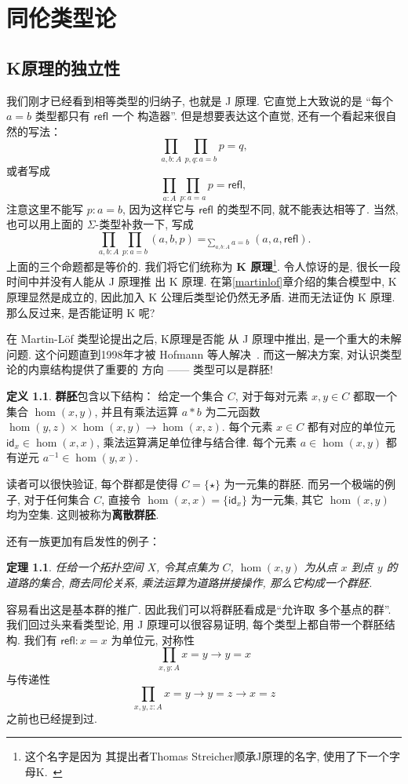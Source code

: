 \documentclass[UTF8]{ctexbook}
\newcommand{\cons}[1]{\textsf{#1}}
\theoremstyle{plain}
\newtheorem{theorem}{定理}[chapter]
\theoremstyle{definition}
\newtheorem{definition}{定义}[chapter]
\theoremstyle{remark}
\begin{document}
\chapter{同伦类型论}
\section{K原理的独立性}
我们刚才已经看到相等类型的归纳子, 也就是 J 原理. 它直觉上大致说的是
“每个 \(a = b\) 类型都只有 \(\cons{refl}\) 一个
构造器”. 但是想要表达这个直觉, 还有一个看起来很自然的写法：
\[\prod_{a,b : A} \prod_{p,q : a = b} p = q,\]
或者写成
\[\prod_{a : A} \prod_{p : a = a} p = \cons{refl},\]
注意这里不能写 \(p : a = b\), 因为这样它与
\(\cons{refl}\) 的类型不同, 就不能表达相等了.
当然, 也可以用上面的 \(\Sigma\)-类型补救一下, 写成
\[\prod_{a,b : A} \prod_{p: a = b} (a,b,p) =_{\sum_{a,b : A}a = b} (a,a,\cons{refl}).\]
上面的三个命题都是等价的. 我们将它们统称为
\textbf{K 原理}\footnote{这个名字是因为
其提出者Thomas Streicher顺承J原理的名字, 使用了下一个字母K.~\cite{streicher:1993:K}}.
令人惊讶的是, 很长一段时间中并没有人能从 J 原理推
出 K 原理. 在第\ref{martinlof}章介绍的集合模型中,
K 原理显然是成立的, 因此加入 K 公理后类型论仍然无矛盾.
进而无法证伪 K 原理. 那么反过来, 是否能证明 K 呢?

在 Martin-L\"of 类型论提出之后, K原理是否能
从 J 原理中推出, 是一个重大的未解问题.
这个问题直到1998年才被 Hofmann 等人解决~\cite{hofmann:1998:groupoid}.
而这一解决方案, 对认识类型论的内禀结构提供了重要的
方向 ------ 类型可以是群胚!

\begin{definition}
\textbf{群胚}包含以下结构：
给定一个集合 \(C\), 对于每对元素 \(x,y\in C\)
都取一个集合 \(\hom(x,y)\), 并且有乘法运算
\(a * b\) 为二元函数 \(\hom(y,z) \times \hom(x,y) \to \hom(x,z)\).
每个元素 \(x \in C\) 都有对应的单位元
\(\cons{id}_x \in \hom(x,x)\), 乘法运算满足单位律与结合律.
每个元素 \(a \in \hom(x,y)\) 都有逆元
\(a^{-1} \in \hom(y,x)\).
\end{definition}
读者可以很快验证, 每个群都是使得 \(C = \{\star\}\)
为一元集的群胚. 而另一个极端的例子, 对于任何集合 \(C\),
直接令 \(\hom(x,x) = \{\cons{id}_x\}\) 为一元集, 其它 \(\hom(x,y)\)
均为空集. 这则被称为\textbf{离散群胚}.

还有一族更加有启发性的例子：
\begin{theorem}
任给一个拓扑空间 \(X\), 令其点集为
\(C\), \(\hom(x,y)\) 为从点 \(x\) 到点
\(y\) 的道路的集合, 商去同伦关系,
乘法运算为道路拼接操作, 那么它构成一个群胚.
\end{theorem}
容易看出这是基本群的推广. 因此我们可以将群胚看成是“允许取
多个基点的群”. 我们回过头来看类型论,
用 J 原理可以很容易证明, 每个类型上都自带一个群胚结构.
我们有 \(\cons{refl} : x = x\) 为单位元,
对称性
\[\prod_{x, y : A} x = y \to y = x\]
与传递性
\[\prod_{x,y,z : A} x = y \to y = z \to x = z\]
之前也已经提到过.
\end{document}
